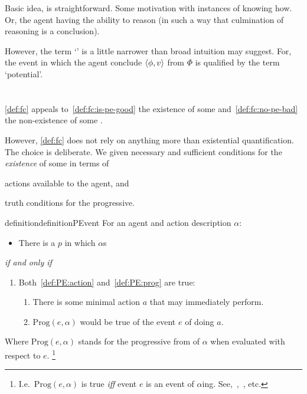 \begin{note}
  Basic idea, is straightforward.
  Some motivation with instances of knowing how.
  Or, the agent having the ability to reason (in such a way that culmination of reasoning is a conclusion).

  However, the term `' is a little narrower than broad intuition may suggest.
  For, the event in which the agent conclude \(\langle \phi, v \rangle\) from \(\Phi\) is qualified by the term `potential'.
\end{note}

\section{}
\label{cha:sec:fcs-def:potential-events}

\begin{note}
  \autoref{def:fc} appeals to~\ref{def:fc:is-pe-good} the existence of some \pevent{} and~\ref{def:fc:no-pe-bad} the non-existence of some \pevent{}.

  However, \autoref{def:fc} does not rely on anything more than existential quantification.
  The choice is deliberate.
  We given necessary and sufficient conditions for the \emph{existence} of some \pevent{} in terms of
  \begin{enumerate*}[label=(\roman*)]
  \item
    actions available to the agent, and
  \item
    truth conditions for the progressive.
  \end{enumerate*}

  \begin{restatable}[\pevent{2}]{definition}{definitionPEvent}
    \label{def:potenital-event}
    For an agent \vAgent{} and action description \(\alpha\):
    \begin{itemize}
    \item
      There is a \pevent{} \(p\) in which \vAgent{} \(\alpha\)s
    \end{itemize}
    \emph{if and only if}
    \begin{enumerate}[label=]
    \item
      Both~\ref{def:PE:action} and~\ref{def:PE:prog} are true:
      \begin{enumerate}[label=\alph*., ref=(\alph*)]
      \item
        \label{def:PE:action}
        There is some minimal action \(a\) that \vAgent{} may immediately perform.
      \item
        \label{def:PE:prog}
        \(\text{Prog}(e, \alpha)\) would be true of the  event \(e\) of \vAgent{} doing \(a\).
      \end{enumerate}
    \end{enumerate}
    Where \(\text{Prog}(e, \alpha)\) stands for the progressive from of \(\alpha\) when evaluated with respect to \(e\).%
    \footnote{
      I.e.\ \(\text{Prog}(e, \alpha)\) is true \emph{iff} event \(e\) is an event of \(\alpha\)ing.
      See,~\textcite{Richards:1981wo},~\textcite{Portner:2011vi}, etc.
    }
  \end{restatable}


\end{note}
